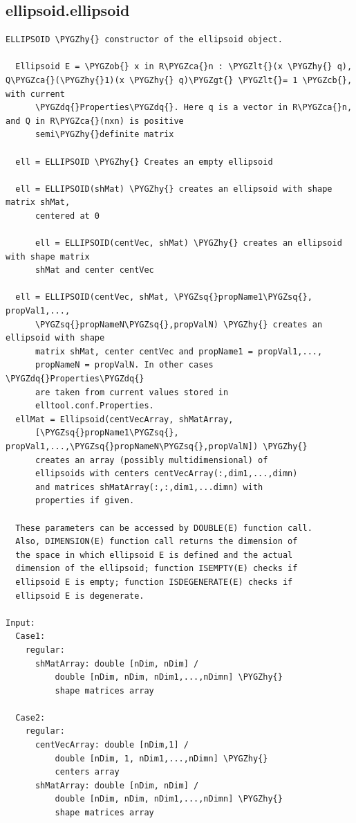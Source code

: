 \documentclass[letterpaper,10pt,english]{sphinxmanual}
\def\PYGZob{\char`\{}
\def\PYGZcb{\char`\}}
\def\PYGZca{\char`\^}
\def\PYGZlt{\char`\<}
\def\PYGZgt{\char`\>}
\def\PYGZhy{\char`\-}
\def\PYGZsq{\char`\'}
\def\PYGZdq{\char`\"}
\begin{document}
\subsection{ellipsoid.ellipsoid}
\label{chap_functions:ellipsoid-ellipsoid}
\begin{Verbatim}[commandchars=\\\{\}]
ELLIPSOID \PYGZhy{} constructor of the ellipsoid object.

  Ellipsoid E = \PYGZob{} x in R\PYGZca{}n : \PYGZlt{}(x \PYGZhy{} q), Q\PYGZca{}(\PYGZhy{}1)(x \PYGZhy{} q)\PYGZgt{} \PYGZlt{}= 1 \PYGZcb{}, with current
      \PYGZdq{}Properties\PYGZdq{}. Here q is a vector in R\PYGZca{}n, and Q in R\PYGZca{}(nxn) is positive
      semi\PYGZhy{}definite matrix

  ell = ELLIPSOID \PYGZhy{} Creates an empty ellipsoid

  ell = ELLIPSOID(shMat) \PYGZhy{} creates an ellipsoid with shape matrix shMat,
      centered at 0

      ell = ELLIPSOID(centVec, shMat) \PYGZhy{} creates an ellipsoid with shape matrix
      shMat and center centVec

  ell = ELLIPSOID(centVec, shMat, \PYGZsq{}propName1\PYGZsq{}, propVal1,...,
      \PYGZsq{}propNameN\PYGZsq{},propValN) \PYGZhy{} creates an ellipsoid with shape
      matrix shMat, center centVec and propName1 = propVal1,...,
      propNameN = propValN. In other cases \PYGZdq{}Properties\PYGZdq{}
      are taken from current values stored in
      elltool.conf.Properties.
  ellMat = Ellipsoid(centVecArray, shMatArray,
      [\PYGZsq{}propName1\PYGZsq{}, propVal1,...,\PYGZsq{}propNameN\PYGZsq{},propValN]) \PYGZhy{}
      creates an array (possibly multidimensional) of
      ellipsoids with centers centVecArray(:,dim1,...,dimn)
      and matrices shMatArray(:,:,dim1,...dimn) with
      properties if given.

  These parameters can be accessed by DOUBLE(E) function call.
  Also, DIMENSION(E) function call returns the dimension of
  the space in which ellipsoid E is defined and the actual
  dimension of the ellipsoid; function ISEMPTY(E) checks if
  ellipsoid E is empty; function ISDEGENERATE(E) checks if
  ellipsoid E is degenerate.

Input:
  Case1:
    regular:
      shMatArray: double [nDim, nDim] /
          double [nDim, nDim, nDim1,...,nDimn] \PYGZhy{}
          shape matrices array

  Case2:
    regular:
      centVecArray: double [nDim,1] /
          double [nDim, 1, nDim1,...,nDimn] \PYGZhy{}
          centers array
      shMatArray: double [nDim, nDim] /
          double [nDim, nDim, nDim1,...,nDimn] \PYGZhy{}
          shape matrices array



\end{Verbatim}
\end{document}
